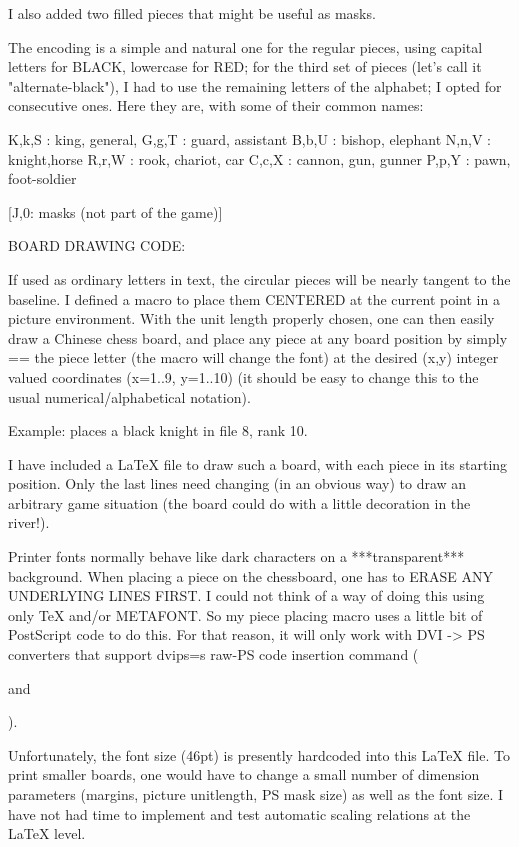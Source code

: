 I also added two filled pieces that might be useful as masks.

The encoding is a simple and natural one for the regular pieces,
using capital letters for BLACK, lowercase for RED; for the third set of 
pieces (let's call it "alternate-black"), I had to use the remaining letters 
of the alphabet; I opted for consecutive ones.  Here they are, with some of 
their common names:


   K,k,S : king, general,
   G,g,T : guard, assistant
   B,b,U : bishop, elephant
   N,n,V : knight,horse
   R,r,W : rook, chariot, car
   C,c,X : cannon, gun, gunner
   P,p,Y : pawn, foot-soldier

   [J,0: masks  (not part of the game)]



BOARD DRAWING CODE:

If used as ordinary letters in text, the circular pieces will be nearly 
tangent to the baseline.  I defined a macro to place them CENTERED at the 
current point in a picture environment.  With the unit length properly 
chosen, one can then easily draw a Chinese chess board, and place any 
piece at any  board position by simply =\putting= the piece letter  (the 
macro will change the font) at the desired (x,y) integer valued coordinates 
(x=1..9, y=1..10)  (it should be easy to change this to the usual 
numerical/alphabetical notation).

  Example:       places a black knight in  file 8, rank 10.

I have included a LaTeX file to draw such a board, with each piece in its 
starting position.  Only the last lines need changing (in an obvious way) to 
draw an arbitrary game situation (the board could do with a little decoration
in the river!).

Printer fonts normally behave like dark characters on a ***transparent*** 
background.  When placing a piece on the chessboard, one has to ERASE ANY 
UNDERLYING LINES FIRST. I could not think of a way of doing  this using only 
TeX and/or METAFONT.  So my piece placing macro uses a little bit of 
PostScript code to do this.  For that reason, it will only work with DVI -> 
PS converters that support  dvips=s raw-PS code insertion command 
( and ).

Unfortunately, the font size (46pt) is presently hardcoded into this LaTeX
file.  To print smaller boards, one would have to change a small number of
dimension parameters (margins, picture unitlength, PS mask size) as well as
the font size.  I have not had time to implement and test automatic scaling
relations at the LaTeX level.

